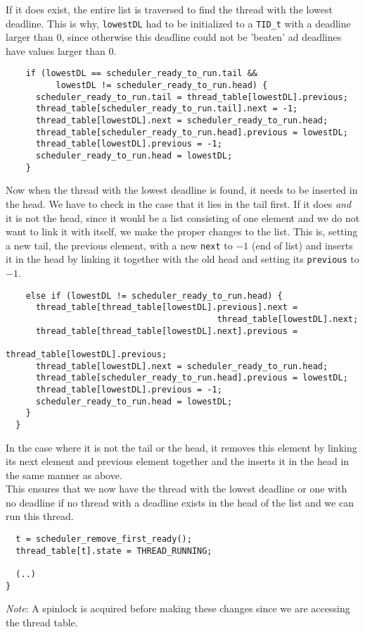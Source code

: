 \documentclass[12pt]{article}
\begin{document}
If it does exist, the entire list is traversed to find the thread with the lowest deadline. This is why, \texttt{lowestDL} had to be initialized to a \texttt{TID\_t} with a deadline larger than 0, since otherwise this deadline could not be 'beaten' ad deadlines have values larger than $0$.
\begin{verbatim}
    if (lowestDL == scheduler_ready_to_run.tail &&
          lowestDL != scheduler_ready_to_run.head) { 
      scheduler_ready_to_run.tail = thread_table[lowestDL].previous;
      thread_table[scheduler_ready_to_run.tail].next = -1;
      thread_table[lowestDL].next = scheduler_ready_to_run.head;
      thread_table[scheduler_ready_to_run.head].previous = lowestDL;
      thread_table[lowestDL].previous = -1;
      scheduler_ready_to_run.head = lowestDL;
    } 
\end{verbatim}
Now when the thread with the lowest deadline is found, it needs to be inserted in the head. We have to check in the case that it lies in the tail first. If it does \textit{and} it is not the head, since it would be a list consisting of one element and we do not want to link it with itself, we make the proper changes to the list. This is, setting a new tail, the previous element, with a new \texttt{next} to $-1$ (end of list) and inserts it in the head by linking it together with the old head and setting its \texttt{previous} to $-1$.
\begin{verbatim}
    else if (lowestDL != scheduler_ready_to_run.head) {
      thread_table[thread_table[lowestDL].previous].next = 
                                          thread_table[lowestDL].next;
      thread_table[thread_table[lowestDL].next].previous = 
                                          thread_table[lowestDL].previous;
      thread_table[lowestDL].next = scheduler_ready_to_run.head;
      thread_table[scheduler_ready_to_run.head].previous = lowestDL;
      thread_table[lowestDL].previous = -1;
      scheduler_ready_to_run.head = lowestDL;
    }
  } 
\end{verbatim}
In the case where it is not the tail or the head, it removes this element by linking its next element and previous element together and the inserts it in the head in the same manner as above. \\
This ensures that we now have the thread with the lowest deadline or one with no deadline if no thread with a deadline exists in the head of the list and we can run this thread.
\begin{verbatim}
  t = scheduler_remove_first_ready();
  thread_table[t].state = THREAD_RUNNING;
  
  (..)
} 
\end{verbatim}
\textit{Note}: A spinlock is acquired before making these changes since we are accessing the thread table.
\end{document}
